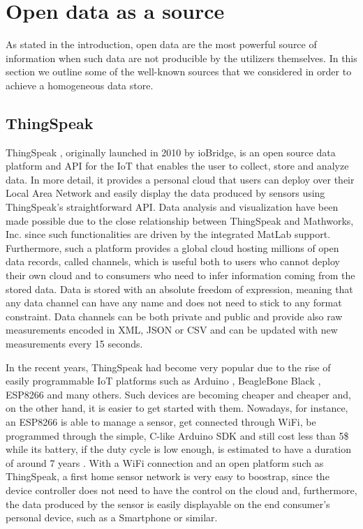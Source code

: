 \documentclass[conference]{IEEEtran}
\begin{document}
\section{Open data as a source}

As stated in the introduction, open data are the most powerful source of information when such data are not producible by the utilizers themselves.
In this section we outline some of the well-known sources that we considered in order to achieve a homogeneous data store.

\subsection{ThingSpeak}
ThingSpeak \cite{thingspeak}, originally launched in 2010 by ioBridge, is an open source data platform and API for the IoT that enables the user to collect, store and analyze data.
In more detail, it provides a personal cloud that users can deploy over their Local Area Network and easily display the data produced by sensors using ThingSpeak's straightforward API.
Data analysis and visualization have been made possible due to the close relationship between ThingSpeak and Mathworks, Inc. since such functionalities are driven by the integrated MatLab support. 
Furthermore, such a platform provides a global cloud hosting millions of open data records, called channels, which is useful both to users who cannot deploy their own cloud and to consumers who need to infer information coming from the stored data.
Data is stored with an absolute freedom of expression, meaning that any data channel can have any name and does not need to stick to any format constraint.
Data channels can be both private and public and provide also raw measurements encoded in XML, JSON or CSV and can be updated with new measurements every 15 seconds.

In the recent years, ThingSpeak had become very popular due to the rise of easily programmable IoT platforms such as Arduino \cite{arduino}, BeagleBone Black \cite{bbblack}, ESP8266 \cite{esp8266} and many others.
Such devices are becoming cheaper and cheaper and, on the other hand, it is easier to get started with them.
Nowadays, for instance, an ESP8266 is able to manage a sensor, get connected through WiFi, be programmed through the simple, C-like Arduino SDK and still cost less than 5\$ while its battery, if the duty cycle is low enough, is estimated to have a duration of around 7 years \cite{di2015design}.
With a WiFi connection and an open platform such as ThingSpeak, a first home sensor network is very easy to boostrap, since the device controller does not need to have the control on the cloud and, furthermore, the data produced by the sensor is easily displayable on the end consumer's personal device, such as a Smartphone or similar.
\end{document}
